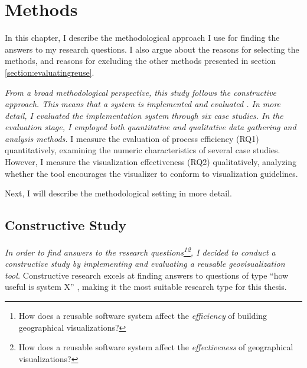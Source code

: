 
\chapter{Methods}
\label{chapter:methods}

In this chapter, I describe the methodological approach I use for finding the answers to my research questions. I also argue about the reasons for selecting the methods, and reasons for excluding the other methods presented in section \ref{section:evaluatingreuse}. 

\emph{From a broad methodological perspective, this study follows the constructive approach. This means that a system is implemented and evaluated \citep{jarvinen_tutkimustyon_2012}. In more detail, I evaluated the implementation system through six case studies. In the evaluation stage, I employed both quantitative and qualitative data gathering and analysis methods.} I measure the evaluation of process efficiency (RQ1) quantitatively, examining the numeric characteristics of several case studies. However, I measure the visualization effectiveness (RQ2) qualitatively, analyzing whether the tool encourages the visualizer to conform to visualization guidelines.

Next, I will describe the methodological setting in more detail.

\section{Constructive Study}

\emph{In order to find answers to the research questions\footnote{How does a reusable software system affect the \emph{efficiency} of building geographical visualizations?}\footnote{How does a reusable software system affect the \emph{effectiveness} of geographical visualizations?}, I decided to conduct a constructive study by implementing and evaluating a reusable geovisualization tool.} Constructive research excels at finding answers to questions of type ``how useful is system X'' \citep{jarvinen_tutkimustyon_2012}, making it the most suitable research type for this thesis.

